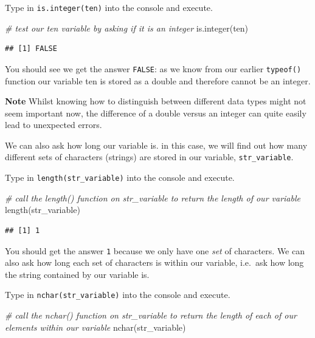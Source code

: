 \documentclass[
]{book}
\newenvironment{Shaded}{\begin{snugshade}}{\end{snugshade}}
\newcommand{\CommentTok}[1]{\textcolor[rgb]{0.56,0.35,0.01}{\textit{#1}}}
\newcommand{\FunctionTok}[1]{\textcolor[rgb]{0.00,0.00,0.00}{#1}}
\newcommand{\NormalTok}[1]{#1}
\begin{document}
Type in \texttt{is.integer(ten)} into the console and execute.

\begin{Shaded}
\begin{Highlighting}[]
\CommentTok{\# test our ten variable by asking if it is an integer}
\FunctionTok{is.integer}\NormalTok{(ten)}
\end{Highlighting}
\end{Shaded}

\begin{verbatim}
## [1] FALSE
\end{verbatim}

You should see we get the answer \texttt{FALSE}: as we know from our earlier \texttt{typeof()} function our variable ten is stored as a double and therefore cannot be an integer.

\textbf{Note}
Whilst knowing how to distinguish between different data types might not seem important now, the difference of a double versus an integer can quite easily lead to unexpected errors.

We can also ask how long our variable is. in this case, we will find out how many different sets of characters (strings) are stored in our variable, \texttt{str\_variable}.

Type in \texttt{length(str\_variable)} into the console and execute.

\begin{Shaded}
\begin{Highlighting}[]
\CommentTok{\# call the length() function on str\_variable to return the length of our variable}
\FunctionTok{length}\NormalTok{(str\_variable)}
\end{Highlighting}
\end{Shaded}

\begin{verbatim}
## [1] 1
\end{verbatim}

You should get the answer \texttt{1} because we only have one \emph{set} of characters. We can also ask how long each set of characters is within our variable, i.e.~ask how long the string contained by our variable is.

Type in \texttt{nchar(str\_variable)} into the console and execute.

\begin{Shaded}
\begin{Highlighting}[]
\CommentTok{\# call the nchar() function on str\_variable to return the length of each of our elements within our variable}
\FunctionTok{nchar}\NormalTok{(str\_variable)}
\end{Highlighting}
\end{Shaded}
\end{document}

